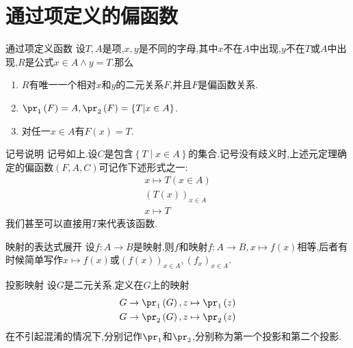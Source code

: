 \section{通过项定义的偏函数}

\begin{metatheorem}{通过项定义函数}{}
	设$T,A$是项,$x,y$是不同的字母,其中$x$不在$A$中出现,$y$不在$T$或$A$中出现,$R$是公式$x\in A\wedge y=T$.那么
	\begin{enumerate}
		\item $R$有唯一一个相对$x$和$y$的二元关系$F$,并且$F$是偏函数关系.
		\item $\pr_{1}\left(F\right)=A,\pr_{2}\left(F\right)=\left\{T\middle|x\in A\right\}$.
		\item 对任一$x\in A$有$F\left(x\right)=T$.
	\end{enumerate}
\end{metatheorem}

\begin{remark}{记号说明}{}
	记号如上.设$C$是包含$\left\{T\middle|x\in A\right\}$的集合.记号没有歧义时,上述元定理确定的偏函数$\left(F,A,C\right)$可记作下述形式之一:
	\begin{gather*}
		x\mapsto T\left(x\in A\right)\\
		\left(T\left(x\right)\right)_{x\in A}\\
		x\mapsto T
	\end{gather*}
	我们甚至可以直接用$T$来代表该函数.
\end{remark}

\begin{example}{映射的表达式展开}{}
	设$f:A\to B$是映射,则$f$和映射$f:A\to B,x\mapsto f\left(x\right)$相等,后者有时候简单写作$x\mapsto f\left(x\right)$或$\left(f\left(x\right)\right)_{x\in A},\left(f_{x}\right)_{x\in A}$.
\end{example}

\begin{example}{投影映射}{}
	设$G$是二元关系.定义在$G$上的映射
	\begin{gather*}
		G\to\pr_{1}\left(G\right),z\mapsto\pr_{1}\left(z\right)\\
		G\to\pr_{2}\left(G\right),z\mapsto\pr_{2}\left(z\right)
	\end{gather*}
	在不引起混淆的情况下,分别记作$\pr_{1}$和$\pr_{2}$,分别称为第一个投影和第二个投影.
\end{example}



























